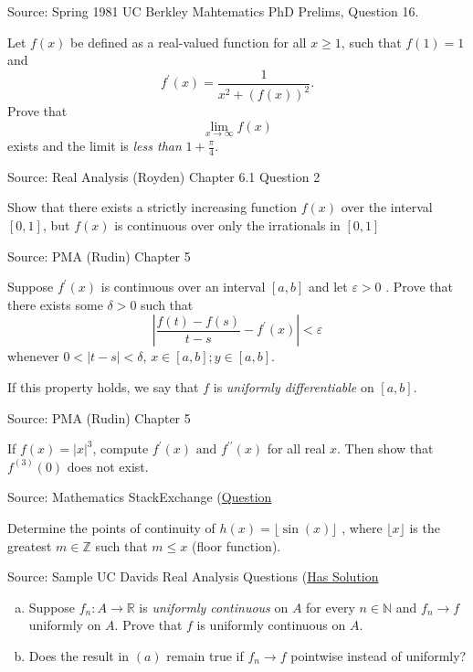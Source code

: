 \documentclass[letterpaper,twoside]{book}
\newcounter{ex}
\begin{document}
\begin{que}
		Source: Spring 1981 UC Berkley Mahtematics PhD Prelims, Question 16.

Let $f(x)$ be defined as a real-valued function for all $x\ge 1$, such that $f(1)=1$ and \[f^\prime(x) = \frac{1}{x^2 + (f(x))^2}.\]
Prove that \[\lim_{x\to\infty}f(x)\] exists and the limit is \emph{less than} $1+\frac{\pi}{4}$. 
\end{que}	
\begin{que}
Source: Real Analysis (Royden) Chapter 6.1 Question 2

Show that there exists a strictly increasing function $f(x)$ over the interval $[0,1]$, but $f(x)$ is continuous over only the irrationals in $[0,1]$ 
\end{que}	
\begin{que}
Source: PMA (Rudin) Chapter 5

Suppose $f^\prime(x)$ is continuous over an interval $[a,b]$ and let $\varepsilon>0$ . Prove that there exists some $\delta>0$ such that 
\[\left|\frac{f(t)-f(s)}{t-s}- f^\prime(x)\right|<\varepsilon\]
whenever $0<\left|t-s\right|<\delta$, $x\in [a,b]; y\in [a,b]$.

If this property holds, we say that $f$ is \emph{uniformly differentiable} on $[a,b]$.
\end{que}	
\begin{que}
Source: PMA (Rudin) Chapter 5

If $f(x) = \left|x\right|^3$, compute $f^\prime(x) \text{ and } f^{\prime\prime}(x)$  for all real $x$. Then show that $f^{(3)}(0)$ does not exist. 
\end{que}	
\begin{que}
		Source: Mathematics StackExchange (\href{https://math.stackexchange.com/questions/4797989/determine-the-points-of-continuity-of-hx-lfloor-sinx-rfloor}{Question}

Determine the points of continuity of $h(x)=\lfloor \sin(x)\rfloor$ , where $\lfloor x \rfloor$  is the greatest $m\in\mathbb{Z}$ such that $m\le x$  (floor function).
\end{que}	
\begin{que}
		Source: Sample UC Davids Real Analysis Questions (\href{https://www.math.ucdavis.edu/~hunter/m125a/m125a_sample_final_solutions.pdf}{Has Solution}

		\begin{enumerate}[(a)]
				\item Suppose $f_n\colon A \to \mathbb{R}$ is \emph{uniformly continuous} on $A$ for every $n\in\mathbb{N}$ and $f_n\to f$ uniformly on $A$.
						Prove that $f$ is uniformly continuous on $A$. 
				\item Does the result in $(a)$ remain true if $f_n\to f$ pointwise instead of uniformly?
		\end{enumerate}	
\end{que}	
\end{document}
